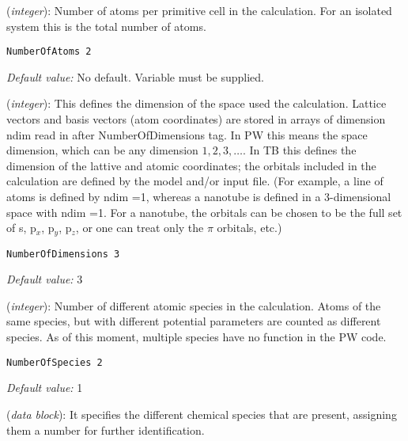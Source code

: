 \begin{description}
\itemsep 10pt
\parsep 0pt

\item[{\bf NumberOfAtoms}] ({\it integer}):
 Number of atoms per
primitive cell in the calculation.  For an isolated system this is
the total number of atoms.

\begin{verbatim}
NumberOfAtoms 2
\end{verbatim}

{\it Default value:} No default. Variable must be supplied.

\item[{\bf NumberOfDimensions}] ({\it integer}):
 This defines the
dimension of the space used the calculation.  Lattice vectors and
basis vectors (atom coordinates) are stored in arrays of dimension
ndim read in after NumberOfDimensions tag. In PW this means the space
dimension, which can be any dimension $1,2,3, \ldots$. In TB this
defines the dimension of the lattive and atomic coordinates; the
orbitals included in the calculation are defined by the model and/or
input file.  (For example, a line of atoms is defined by ndim =1,
whereas a nanotube is defined in a 3-dimensional space with ndim
=1. For a nanotube, the orbitals can be chosen to be the full set of
s, p$_x$, p$_y$, p$_z$, or one can treat only the $\pi$ orbitals, etc.)

\begin{verbatim}
NumberOfDimensions 3
\end{verbatim}

 {\it Default value:} 3

\item[{\bf NumberOfSpecies}] ({\it integer}):
 Number of different
atomic species in the calculation.  Atoms of the same species, but
with different potential parameters are counted as different
species. As of this moment, multiple species have no function in
the PW code.
\begin{verbatim}
NumberOfSpecies 2
\end{verbatim}

{\it Default value:} 1

\item[{\bf ChemicalSpeciesLabel}] ({\it data block}):
It specifies the different chemical species that are
present, assigning them a number for further identification.


\end{description}
